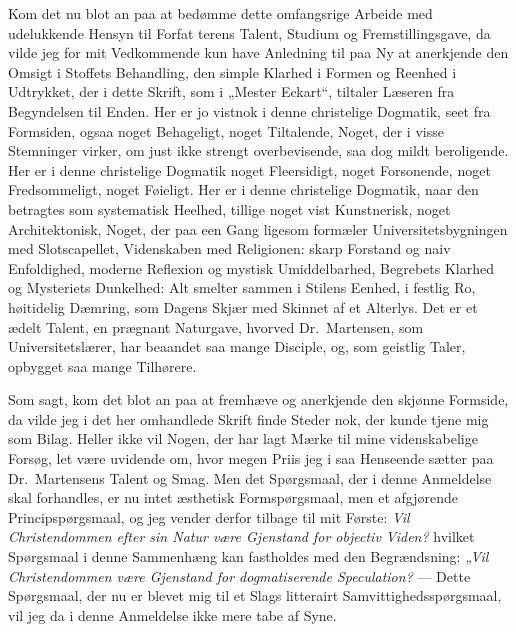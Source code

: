 Kom det nu blot an paa at bedømme dette omfangsrige Arbeide med
udelukkende Hensyn til Forfat%
terens Talent, Studium og Fremstillingsgave, da vilde jeg for mit
Vedkommende kun have Anledning til paa Ny at anerkjende den Omsigt
i Stoffets Behandling, den simple Klarhed i Formen og Reenhed i
Udtrykket, der i dette Skrift, som i „Mester Eckart“, tiltaler
Læseren fra Begyndelsen til Enden. Her er jo vistnok i denne
christelige Dogmatik, seet fra Formsiden, ogsaa noget Behageligt,
noget Tiltalende, Noget, der i visse Stemninger virker, om just
ikke strengt overbevisende, saa dog mildt beroligende. Her er i
denne christelige Dogmatik noget Fleersidigt, noget Forsonende,
noget Fredsommeligt, noget Føieligt. Her er i denne christelige
Dogmatik, naar den betragtes som systematisk Heelhed, tillige
noget vist Kunstnerisk, noget Architektonisk, Noget, der paa een
Gang ligesom formæler Universitetsbygningen med Slotscapellet,
Videnskaben med Religionen: skarp Forstand og naiv Enfoldighed,
moderne Reflexion og mystisk Umiddelbarhed, Begrebets Klarhed og
Mysteriets Dunkelhed: Alt smelter sammen i Stilens Eenhed, i
festlig Ro, høitidelig Dæmring, som Dagens Skjær med Skinnet af et
Alterlys. Det er et ædelt Talent, en prægnant Naturgave, hvorved
Dr.\ Martensen, som Universitetslærer, har beaandet saa mange
Disciple, og, som geistlig Taler, opbygget saa mange Tilhørere.

Som sagt, kom det blot an paa at fremhæve og anerkjende den
skjønne Formside, da vilde jeg i det her omhandlede Skrift finde
Steder nok, der kunde tjene mig som Bilag. Heller ikke vil Nogen,
der har lagt Mærke
 til mine videnskabelige Forsøg, let være uvidende om, hvor megen
Priis jeg i saa Henseende sætter paa Dr.\ Martensens Talent og
Smag. Men det Spørgsmaal, der i denne Anmeldelse skal forhandles,
er nu intet æsthetisk Formspørgsmaal, men et afgjørende
Principspørgsmaal, og jeg vender derfor tilbage til mit Første:
\emph{Vil Christendommen efter sin Natur være Gjenstand for
objectiv Viden?} hvilket Spørgsmaal i denne Sammenhæng kan
fastholdes med den Begrændsning: \emph{„Vil Christendommen være
Gjenstand for dogmatiserende Speculation?} --- Dette Spørgsmaal,
der nu er blevet mig til et Slags litterairt
Samvittighedsspørgsmaal, vil jeg da i denne Anmeldelse ikke mere
tabe af Syne.

